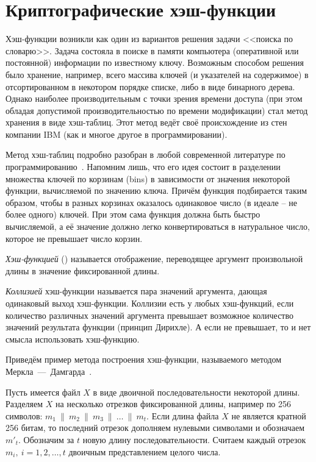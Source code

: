 \chapter{Криптографические хэш-функции}\label{chapter-hash-functions}

Хэш-функции возникли как один из вариантов решения задачи <<поиска по словарю>>. Задача состояла в поиске в памяти компьютера (оперативной или постоянной) информации по известному ключу. Возможным способом решения было хранение, например, всего массива ключей (и указателей на содержимое) в отсортированном в некотором порядке списке, либо в виде бинарного дерева. Однако наиболее производительным с точки зрения времени доступа (при этом обладая допустимой производительностью по времени модификации) стал метод хранения в виде хэш-таблиц. Этот метод ведёт своё происхождение из стен компании IBM (как и многое другое в программировании).

Метод хэш-таблиц подробно разобран в любой современной литературе по программированию~\cite{Knuth:2001:3}. Напомним лишь, что его идея состоит в разделении множества ключей по корзинам (bins) в зависимости от значения некоторой функции, вычисляемой по значению ключа. Причём функция подбирается таким образом, чтобы в разных корзинах оказалось одинаковое число (в идеале -- не более одного) ключей. При этом сама функция должна быть быстро вычисляемой, а её значение должно легко конвертироваться в натуральное число, которое не превышает число корзин.

\emph{Хэш-функцией} () называется отображение, переводящее аргумент произвольной длины в значение фиксированной длины.

\emph{Коллизией} хэш-функции называется пара значений аргумента, дающая одинаковый выход хэш-функции. Коллизии есть у любых хэш-функций, если количество различных значений аргумента превышает возможное количество значений результата функции (принцип Дирихле). А если не превышает, то и нет смысла использовать хэш-функцию.

\example
Приведём пример метода построения хэш-функции, называемого методом Меркла~---~Дамгарда~\cite{Merkle:1979, Merkle:1990, Damgard:1990}.

Пусть имеется файл $X$ в виде двоичной последовательности некоторой длины. Разделяем $X$ на несколько отрезков фиксированной длины, например по 256 символов:  $m_{1} ~\|~ m_{2} ~\|~ m_{3} ~\|~ \ldots ~\|~ m_{t}$. Если длина файла $X$ не является кратной 256 битам, то последний отрезок дополняем нулевыми символами и обозначаем $m'_{t}$.
Обозначим за $t$ новую длину последовательности. Считаем каждый отрезок $m_i, ~ i = 1, 2, \dots, t$ двоичным представлением целого числа.


